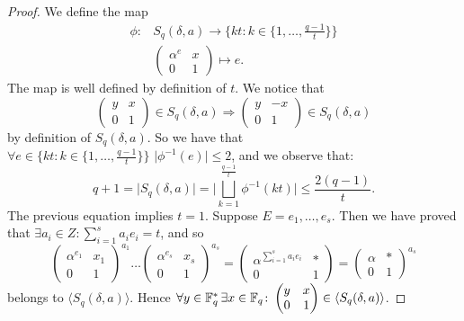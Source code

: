\begin{theorem}
\begin{proof}
We define the map
\begin{align*}
	\phi \colon & S_q(\delta,a) \longrightarrow \{kt \colon k \in \{1, \dots ,\frac{q-1}{t}\}\}\\
				&  \begin{pmatrix} \alpha^e & x \\ 0 & 1 \end{pmatrix} \longmapsto e.
\end{align*}
The map is well defined by definition of $t$.
We notice that
\begin{equation}\label{double}
\begin{pmatrix} y & x \\ 0 & 1 \end{pmatrix} \in S_q(\delta,a) \Rightarrow \begin{pmatrix} y & -x \\ 0 & 1 \end{pmatrix} \in S_q(\delta,a)
\end{equation}
by definition of $S_q(\delta,a)$. So we have that
$\forall e \in \{kt \colon k \in \{1, \dots ,\frac{q-1}{t}\}\} \,\, \vert \phi^{-1}(e)\vert \le 2$, and we observe that:
\begin{equation*}
	q+1 = \vert S_q(\delta,a)\vert = \vert \bigsqcup_{k=1}^{\frac{q-1}{t}} \phi^{-1}(kt) \vert \le \frac{2(q-1)}{t}.
\end{equation*}
The previous equation implies $t=1$.
Suppose $E={e_1,\dots, e_s}$. Then we have proved that $\exists a_i \in Z \colon \sum_{i=1}^s a_i e_i =t$, and so
\begin{equation}
	\begin{pmatrix} \alpha^{e_1} & x_1 \\ 0 & 1 \end{pmatrix}^{a_1} \dots 
	\begin{pmatrix} \alpha^{e_s} & x_s \\ 0 & 1 \end{pmatrix}^{a_s}=
	\begin{pmatrix} \alpha^{\sum_{i=1}^s a_i e_i} & * \\ 0 & 1 \end{pmatrix}=
	\begin{pmatrix} \alpha & * \\ 0 & 1 \end{pmatrix}^{a_s}
\end{equation}
 belongs to $\langle S_q(\delta,a) \rangle$. Hence $\forall y \in {\mathbb F}_q^{*}\, \exists x \in {\mathbb F}_q \colon 
 \begin{pmatrix} y & x \\ 0 & 1 \end{pmatrix} \in \langle S_q(\delta,a) \rangle$. 


\end{proof}
\end{theorem}
